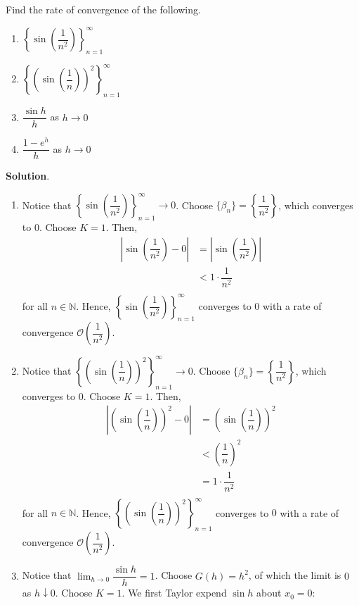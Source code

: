 \documentclass[11pt]{article}
\theoremstyle{break}
\numberwithin{equation}{theorem}
\begin{document}
\newpage
\begin{problem}\label{problem 10}
    Find the rate of convergence of the following.
    \begin{enumerate}
        \item $\left\{\sin\left(\dfrac{1}{n^2}\right)\right\}_{n=1}^\infty $
        \item $\left\{\left(\sin\left(\dfrac{1}{n}\right)\right)^2\right\}_{n=1}^\infty $
        \item $\dfrac{\sin h}{h}$ as $h\to 0$
        \item $\dfrac{1-e^h}{h}$ as $h\to 0$
    \end{enumerate}
\end{problem}
\textbf{Solution}.
\begin{enumerate}
    \item Notice that $\left\{\sin\left(\dfrac{1}{n^2}\right)\right\}_{n=1}^\infty\to 0$. Choose $\{\beta_n\}=\left\{\dfrac{1}{n^2}\right\}$, which converges to $0$. Choose $K=1$. Then, \vspace{-0.6em}
    \begin{align*}
        \left\lvert\sin\left(\dfrac{1}{n^2}\right)-0\right\rvert&=\left\lvert\sin\left(\dfrac{1}{n^2}\right)\right\rvert\\
        &<1\cdot\dfrac{1}{n^2}\\[-3.4em]
    \end{align*}
    for all $n\in\mathbb{N}$. Hence, $\left\{\sin\left(\dfrac{1}{n^2}\right)\right\}_{n=1}^\infty$ converges to $0$ with a rate of convergence $\mathcal{O}\left(\dfrac{1}{n^2}\right)$.
    \item Notice that $\left\{\left(\sin\left(\dfrac{1}{n}\right)\right)^2\right\}_{n=1}^\infty\to 0$. Choose $\{\beta_n\}=\left\{\dfrac{1}{n^2}\right\}$, which converges to $0$. Choose $K=1$. Then, \vspace{-0.6em}
    \begin{align*}
        \left\lvert\left(\sin\left(\dfrac{1}{n}\right)\right)^2-0\right\rvert&=\left(\sin\left(\dfrac{1}{n}\right)\right)^2\\
        &<\left(\dfrac{1}{n}\right)^2\\
        &=1\cdot\dfrac{1}{n^2}\\[-3.4em]
    \end{align*}
    for all $n\in\mathbb{N}$. Hence, $\left\{\left(\sin\left(\dfrac{1}{n}\right)\right)^2\right\}_{n=1}^\infty$ converges to $0$ with a rate of convergence $\mathcal{O}\left(\dfrac{1}{n^2}\right)$.
    \item Notice that $\displaystyle\lim_{h\to 0}\dfrac{\sin h}{h}=1$. Choose $G(h)=h^2$, of which the limit is $0$ as $h\downarrow 0$. Choose $K=1$. We first Taylor expend $\sin h$ about $x_0=0$: \vspace{-0.6em}

\end{enumerate}
\end{document}
